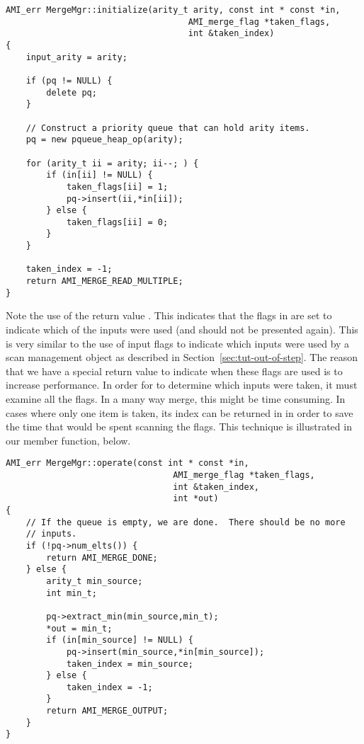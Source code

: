 \begin{verbatim}
AMI_err MergeMgr::initialize(arity_t arity, const int * const *in,
                                    AMI_merge_flag *taken_flags,
                                    int &taken_index)
{
    input_arity = arity;

    if (pq != NULL) {
        delete pq;
    }

    // Construct a priority queue that can hold arity items.
    pq = new pqueue_heap_op(arity);

    for (arity_t ii = arity; ii--; ) {
        if (in[ii] != NULL) {
            taken_flags[ii] = 1;
            pq->insert(ii,*in[ii]);
        } else {
            taken_flags[ii] = 0;
        }
    }

    taken_index = -1;
    return AMI_MERGE_READ_MULTIPLE;
}
\end{verbatim}

Note the use of the return value .  This
indicates that the flags in  are set to
indicate which of the inputs were used (and should not be presented
again).  This is very similar to the use of input flags to indicate
which inputs were used by a scan management object as described in
Section~\ref{sec:tut-out-of-step}.  The reason that we have a special
return value to indicate when these flags are used is to increase
performance.  In order for  to determine which inputs
were taken, it must examine all the flags.  In a many way merge, this
might be time consuming.  In cases where only one item is taken, its
index can be returned in  in order to save the time
that would be spent scanning the flags.  This technique is illustrated in our
 member function, below.

\begin{verbatim}
AMI_err MergeMgr::operate(const int * const *in,
                                 AMI_merge_flag *taken_flags,
                                 int &taken_index,
                                 int *out)
{
    // If the queue is empty, we are done.  There should be no more
    // inputs.
    if (!pq->num_elts()) {
        return AMI_MERGE_DONE;
    } else {
        arity_t min_source;
        int min_t;

        pq->extract_min(min_source,min_t);
        *out = min_t;
        if (in[min_source] != NULL) {
            pq->insert(min_source,*in[min_source]);
            taken_index = min_source;
        } else {
            taken_index = -1;
        }
        return AMI_MERGE_OUTPUT;
    }
}
\end{verbatim}

